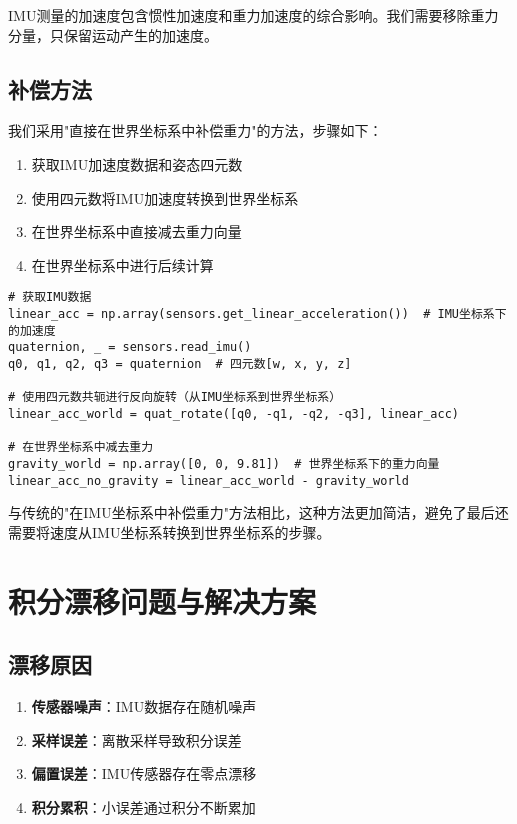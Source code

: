 \documentclass[12pt,a4paper]{article}
\begin{document}
IMU测量的加速度包含惯性加速度和重力加速度的综合影响。我们需要移除重力分量，只保留运动产生的加速度。

\subsection{补偿方法}

我们采用"直接在世界坐标系中补偿重力"的方法，步骤如下：

\begin{enumerate}
    \item 获取IMU加速度数据和姿态四元数
    \item 使用四元数将IMU加速度转换到世界坐标系
    \item 在世界坐标系中直接减去重力向量
    \item 在世界坐标系中进行后续计算
\end{enumerate}

\begin{lstlisting}
# 获取IMU数据
linear_acc = np.array(sensors.get_linear_acceleration())  # IMU坐标系下的加速度
quaternion, _ = sensors.read_imu()
q0, q1, q2, q3 = quaternion  # 四元数[w, x, y, z]

# 使用四元数共轭进行反向旋转（从IMU坐标系到世界坐标系）
linear_acc_world = quat_rotate([q0, -q1, -q2, -q3], linear_acc)

# 在世界坐标系中减去重力
gravity_world = np.array([0, 0, 9.81])  # 世界坐标系下的重力向量
linear_acc_no_gravity = linear_acc_world - gravity_world
\end{lstlisting}

与传统的"在IMU坐标系中补偿重力"方法相比，这种方法更加简洁，避免了最后还需要将速度从IMU坐标系转换到世界坐标系的步骤。

\section{积分漂移问题与解决方案}

\subsection{漂移原因}

\begin{enumerate}
    \item \textbf{传感器噪声}：IMU数据存在随机噪声
    \item \textbf{采样误差}：离散采样导致积分误差
    \item \textbf{偏置误差}：IMU传感器存在零点漂移
    \item \textbf{积分累积}：小误差通过积分不断累加
\end{enumerate}
\end{document}
